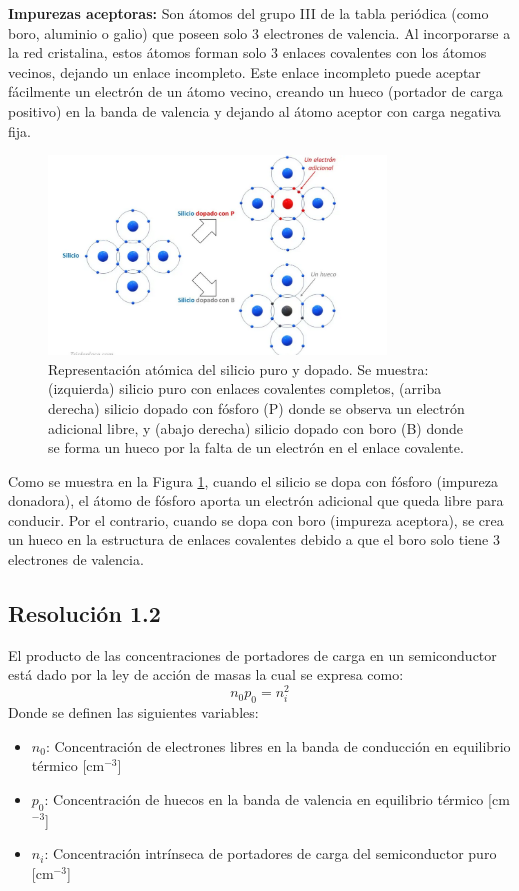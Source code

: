 \documentclass[
  11pt,
  letterpaper,
   addpoints,
  ]{exam}
\begin{document}
\begin{questions}
\begin{solution}
\textbf{Impurezas aceptoras:} Son átomos del grupo III de la tabla periódica (como boro, aluminio o galio) que poseen solo 3 electrones de valencia. Al incorporarse a la red cristalina, estos átomos forman solo 3 enlaces covalentes con los átomos vecinos, dejando un enlace incompleto. Este enlace incompleto puede aceptar fácilmente un electrón de un átomo vecino, creando un hueco (portador de carga positivo) en la banda de valencia y dejando al átomo aceptor con carga negativa fija.
\begin{figure}[H]
    \centering
    \includegraphics[width=0.8\textwidth]{../figures/Auxiliar_2_3}
    \caption{Representación atómica del silicio puro y dopado. Se muestra: (izquierda) silicio puro con enlaces covalentes completos, (arriba derecha) silicio dopado con fósforo (P) donde se observa un electrón adicional libre, y (abajo derecha) silicio dopado con boro (B) donde se forma un hueco por la falta de un electrón en el enlace covalente.}
    \label{fig:impurezas}
\end{figure}

Como se muestra en la Figura \ref{fig:impurezas}, cuando el silicio se dopa con fósforo (impureza donadora), el átomo de fósforo aporta un electrón adicional que queda libre para conducir. Por el contrario, cuando se dopa con boro (impureza aceptora), se crea un hueco en la estructura de enlaces covalentes debido a que el boro solo tiene 3 electrones de valencia.
\subsection*{Resolución 1.2}
El producto de las concentraciones de portadores de carga en un semiconductor está dado por la ley de acción de masas la cual se expresa como:
\begin{equation}
  n_0 p_0 = n_i^{2}  
\end{equation}
Donde se definen las siguientes variables:
\begin{itemize}
    \item $n_0$: Concentración de electrones libres en la banda de conducción en    equilibrio térmico [cm$^{-3}$]
    \item $p_0$: Concentración de huecos en la banda de valencia en equilibrio térmico [cm$^{-3}$]
    \item $n_i$: Concentración intrínseca de portadores de carga del semiconductor puro [cm$^{-3}$]
\end{itemize}


\end{solution}
\end{questions}
\end{document}
